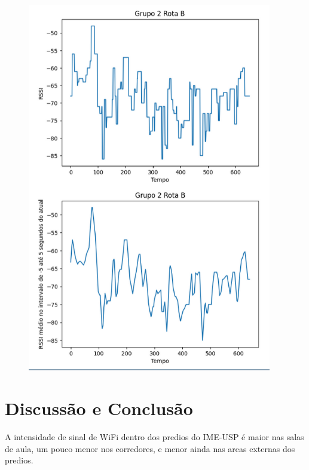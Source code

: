 \documentclass{article}
\begin{document}
\begin{figure}
  \begin{center}
    \includegraphics[width=0.95\textwidth]{figures/grupo_2-rota_b}
  \end{center}
  \caption{}\label{fig:}
\end{figure}


\section{Discussão e Conclusão}
A intensidade de sinal de WiFi dentro dos predios do IME-USP é maior nas salas de aula, um pouco
menor nos corredores, e menor ainda nas areas externas dos predios. 
\end{document}
